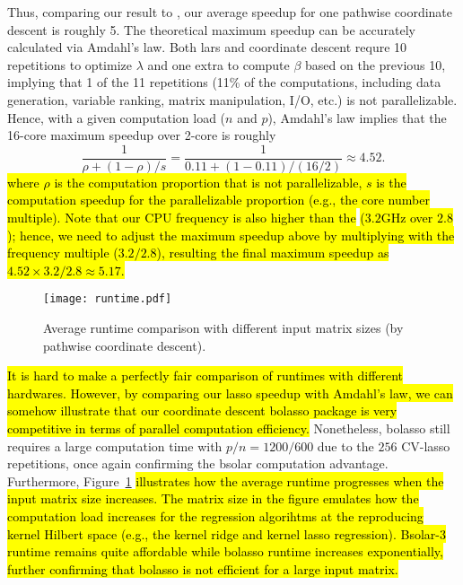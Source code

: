 \documentclass[11pt,review,authoryear]{elsarticle}
\begin{document}
Thus, comparing our result to \citet{friedman2010regularization}, our average speedup for one pathwise coordinate descent is roughly 5. The theoretical maximum speedup can be accurately calculated via Amdahl's law. Both lars and coordinate descent requre 10 repetitions to optimize $\lambda$ and one extra to compute $\beta$ based on the previous 10, implying that 1 of the 11 repetitions (11\% of the computations, including data generation, variable ranking, matrix manipulation, I/O, etc.) is not parallelizable. Hence, with a given computation load ($n$ and $p$), Amdahl's law implies that the 16-core maximum speedup over 2-core is roughly
%
\begin{equation}
  \frac{1}{\rho + (1-\rho)/s} = \frac{1}{0.11 + (1-0.11)/(16/2)} \approx 4.52.
\end{equation}
%
\hl{where $\rho$ is the computation proportion that is not parallelizable, $s$ is the computation speedup for the parallelizable proportion (e.g., the core number multiple). Note that our CPU frequency is also higher than the} \citet[Table 1]{friedman2010regularization} \hl{($3.2$GHz over $2.8$); hence, we need to adjust the maximum speedup above by multiplying with the frequency multiple ($3.2/2.8$), resulting the final maximum speedup as $4.52 \times 3.2/2.8 \approx 5.17$.}

\begin{figure}[h]
  \centering
  \texttt{[image: runtime.pdf]}
  \caption{Average runtime comparison with different input matrix sizes (by pathwise coordinate descent).}
  \label{fig:runtime}
\end{figure}


\hl{It is hard to make a perfectly fair comparison of runtimes with different hardwares. However, by comparing our lasso speedup with Amdahl's law, we can somehow illustrate that our coordinate descent bolasso package is very competitive in terms of parallel computation efficiency.} Nonetheless, bolasso still requires a large computation time with $p/n=1200/600$ due to the $256$ CV-lasso repetitions, once again confirming the bsolar computation advantage. Furthermore, Figure~\ref{fig:runtime} \hl{illustrates how the average runtime progresses when the input matrix size increases. The matrix size in the figure emulates how the computation load increases for the regression algorihtms at the reproducing kernel Hilbert space (e.g., the kernel ridge and kernel lasso regression). Bsolar-3 runtime remains quite affordable while bolasso runtime increases exponentially, further confirming that bolasso is not efficient for a large input matrix.}
\end{document}
